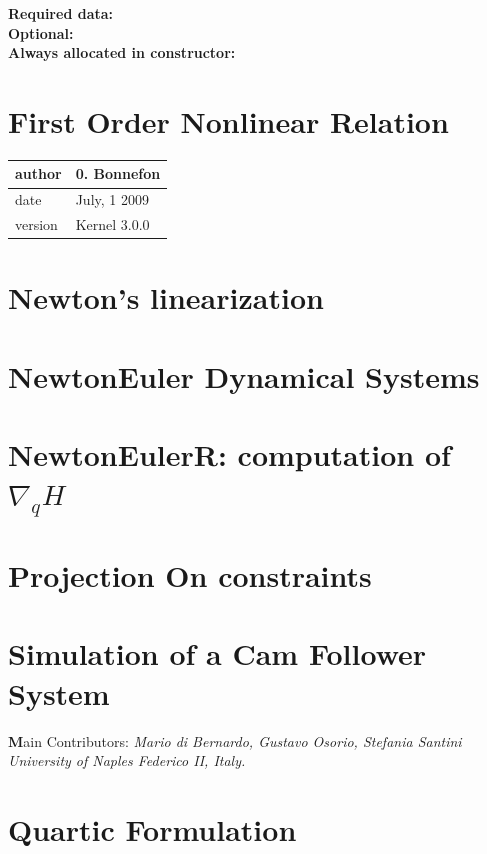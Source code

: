 \documentclass[10pt]{report}
\begin{document}
\textbf{Required data:}\\

\textbf{Optional:}\\

\textbf{Always allocated in constructor:} \\

\chapter{First Order Nonlinear Relation }

\begin{table}[!ht]
  \begin{tabular}{|l|l|}
    \hline
    author  & 0. Bonnefon \\
    \hline
    date    & July, 1 2009 \\ 
    \hline
    version & Kernel 3.0.0 \\
    \hline
  \end{tabular}
\end{table}

\chapter{Newton's linearization}


\chapter{NewtonEuler Dynamical Systems}

\chapter{NewtonEulerR: computation of $\nabla _qH$}

\chapter{Projection On constraints}


%  


\chapter{Simulation of a Cam Follower System}
{\textbf Main Contributors:} {\textit{Mario di Bernardo, Gustavo Osorio, Stefania Santini}}\\
\textit{University of Naples Federico II, Italy.}\\


\chapter{Quartic Formulation}

\end{document}
